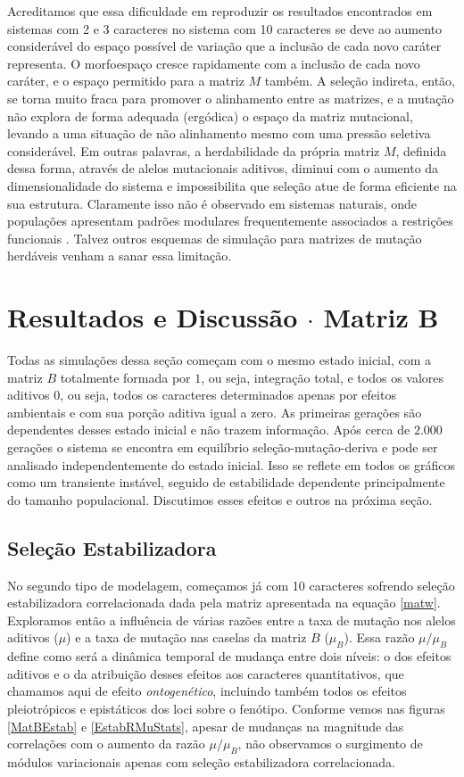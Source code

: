 Acreditamos que essa dificuldade em reproduzir os resultados encontrados
em sistemas com 2 e 3 caracteres no sistema com 10 caracteres se deve ao aumento
considerável do espaço possível de variação que a inclusão de cada novo
caráter representa. 
O morfoespaço cresce rapidamente com a inclusão de cada novo caráter, e
o espaço permitido para a matriz $M$ também. 
A seleção indireta, então, se torna muito fraca para promover o
alinhamento entre as matrizes, e a mutação não explora de forma adequada
(ergódica) o espaço da matriz mutacional, levando a uma situação de não alinhamento
mesmo com uma pressão seletiva considerável. 
Em outras palavras, a herdabilidade da própria matriz $M$, definida
dessa forma, através de alelos mutacionais aditivos, diminui com o
aumento da dimensionalidade do sistema e impossibilita que seleção atue
de forma eficiente na sua estrutura.
Claramente isso não é observado em sistemas naturais, onde populações
apresentam padrões modulares frequentemente associados a restrições
funcionais \citep{Porto2009}. 
Talvez outros esquemas de simulação para matrizes de mutação herdáveis
venham a sanar essa limitação.

\section{Resultados e Discussão $\cdot$ Matriz $\mathbf{B}$}

Todas as simulações dessa seção começam com o mesmo estado inicial, com
a matriz $B$ totalmente formada por $1$, ou seja, integração total, e
todos os valores aditivos $0$, ou seja, todos os caracteres determinados
apenas por efeitos ambientais e com sua porção aditiva igual a zero. 
As primeiras gerações são dependentes desses estado inicial e não trazem
informação. 
Após cerca de $2.000$ gerações o sistema se encontra em equilíbrio
seleção-mutação-deriva e pode ser analisado independentemente do estado
inicial. 
Isso se reflete em todos os gráficos como um transiente instável, seguido
de estabilidade dependente principalmente do tamanho populacional.
Discutimos esses efeitos e outros na próxima seção. 

\subsection{Seleção Estabilizadora}

No segundo tipo de modelagem, começamos já com 10 caracteres sofrendo
seleção estabilizadora correlacionada dada pela matriz apresentada na
equação \ref{matw}. 
Exploramos então a influência de várias razões entre a taxa de mutação
nos alelos aditivos ($\mu$) e a taxa de mutação nas caselas da matriz
$B$ ($\mu_B$). 
Essa razão $\mu/\mu_B$ define como será a dinâmica temporal de mudança
entre dois níveis: o dos efeitos aditivos e o da atribuição desses
efeitos aos caracteres quantitativos, que chamamos aqui de efeito {\it
ontogenético}, incluindo também todos os efeitos pleiotrópicos e
epistáticos dos loci sobre o fenótipo. 
Conforme vemos nas figuras \ref{MatBEstab} e \ref{EstabRMuStats}, apesar de mudanças na
magnitude das correlações com o aumento da razão $\mu/\mu_B$, não
observamos o surgimento de módulos variacionais apenas com seleção
estabilizadora correlacionada. 


